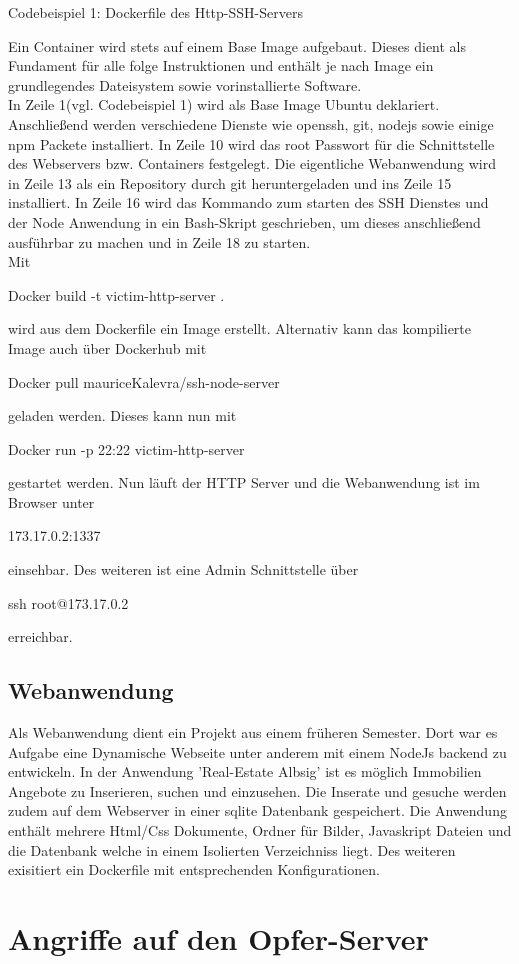 \documentclass[12pt]{article}
\begin{document}
\begin{center}
 Codebeispiel 1: Dockerfile des Http-SSH-Servers
\end{center}
Ein Container wird stets auf einem Base Image aufgebaut. Dieses dient als Fundament für alle folge Instruktionen und enthält je nach Image ein grundlegendes Dateisystem sowie vorinstallierte Software.\\
In Zeile 1(vgl. Codebeispiel 1) wird als Base Image Ubuntu deklariert. 
Anschließend werden verschiedene Dienste wie openssh, git, nodejs sowie einige npm Packete installiert.
In Zeile 10 wird das root Passwort für die Schnittstelle des Webservers bzw. Containers festgelegt. Die eigentliche Webanwendung wird in Zeile 13 als ein Repository durch git heruntergeladen und ins Zeile 15 installiert. In Zeile 16 wird das Kommando zum starten des SSH Dienstes und der Node Anwendung in ein Bash-Skript geschrieben, um dieses anschließend ausführbar zu machen und in Zeile 18 zu starten.\\
Mit \colorbox{mshadecolor}{\parbox{0.46\textwidth}{Docker build -t victim-http-server .}} wird aus dem Dockerfile ein Image erstellt. Alternativ kann das kompilierte Image auch über Dockerhub mit \colorbox{mshadecolor}{\parbox{0.58\textwidth}{Docker pull mauriceKalevra/ssh-node-server}} geladen werden. Dieses kann nun mit \colorbox{mshadecolor}{\parbox{0.51\textwidth}{Docker run -p 22:22 victim-http-server}} gestartet werden. Nun läuft der HTTP Server und die Webanwendung ist im Browser unter
\colorbox{mshadecolor}{\parbox{0.20\textwidth}{173.17.0.2:1337}} einsehbar. Des weiteren ist eine Admin Schnittstelle über \colorbox{mshadecolor}{\parbox{0.26\textwidth}{ssh root@173.17.0.2}} erreichbar.
\subsection{Webanwendung}
Als Webanwendung dient ein Projekt aus einem früheren Semester. Dort war es Aufgabe eine Dynamische Webseite unter anderem mit einem NodeJs backend zu entwickeln. In der Anwendung 'Real-Estate Albsig' ist es möglich Immobilien Angebote zu Inserieren, suchen und einzusehen. Die Inserate und gesuche werden zudem auf dem Webserver in einer sqlite Datenbank gespeichert. Die Anwendung enthält mehrere Html/Css Dokumente, Ordner für Bilder, Javaskript Dateien und die Datenbank welche in einem Isolierten Verzeichniss liegt. Des weiteren exisitiert ein Dockerfile mit entsprechenden Konfigurationen.          
\newpage
\section{Angriffe auf den Opfer-Server}
\end{document}
